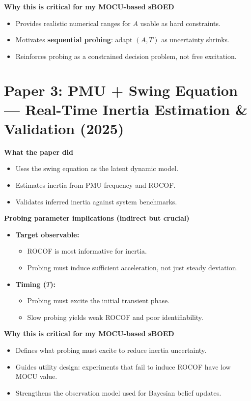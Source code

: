 \documentclass[12pt]{article}
\begin{document}
\textbf{Why this is critical for my MOCU-based sBOED}
\begin{itemize}
  \item Provides realistic numerical ranges for $A$ usable as hard constraints.
  \item Motivates \textbf{sequential probing}: adapt $(A,T)$ as uncertainty shrinks.
  \item Reinforces probing as a constrained decision problem, not free excitation.
\end{itemize}





\newpage
\section*{Paper 3: PMU + Swing Equation — Real-Time Inertia Estimation \& Validation (2025) \cite{pmu2025}}

\textbf{What the paper did}
\begin{itemize}
  \item Uses the swing equation as the latent dynamic model.
  \item Estimates inertia from PMU frequency and ROCOF.
  \item Validates inferred inertia against system benchmarks.
\end{itemize}

\textbf{Probing parameter implications (indirect but crucial)}
\begin{itemize}
  \item \textbf{Target observable:}
  \begin{itemize}
    \item ROCOF is most informative for inertia.
    \item Probing must induce sufficient acceleration, not just steady deviation.
  \end{itemize}

  \item \textbf{Timing ($T$):}
  \begin{itemize}
    \item Probing must excite the initial transient phase.
    \item Slow probing yields weak ROCOF and poor identifiability.
  \end{itemize}
\end{itemize}

\textbf{Why this is critical for my MOCU-based sBOED}
\begin{itemize}
  \item Defines what probing must excite to reduce inertia uncertainty.
  \item Guides utility design: experiments that fail to induce ROCOF have low MOCU value.
  \item Strengthens the observation model used for Bayesian belief updates.
\end{itemize}
\end{document}
